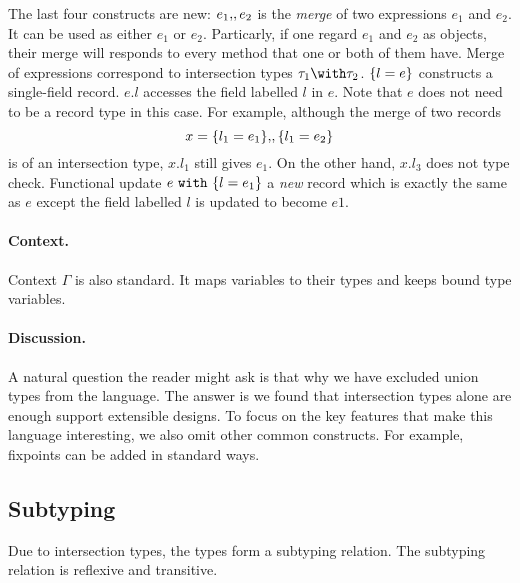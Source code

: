 The last four constructs are new: $ e_1 ,\!, e_2 $ is the \emph{merge} of two
expressions $ e_1 $ and $ e_2 $.
It can be used as either $ e_1 $ or $ e_2 $. Particarly, if one regard $ e_1 $
and $ e_2 $ as objects, their merge will responds to every method that one or
both of them have. Merge of expressions correspond to intersection types
$ \ty_1 \intersects \ty_2 $. $ \{ l = e \} $ constructs a single-field record.
$ e.l $ accesses the field labelled $ l $ in $ e $. Note that $ e $ does not
need to be a record type in this case. For example, although the merge of two
records
\[
x = \{ l_1 = e_1 \} ,\!, \{ l_1 = e_2 \} 
\]
is of an intersection type, $ x.{l_1} $ still gives $ e_1 $. On the other hand,
$ x.{l_3} $ does not type check. Functional update $ e ~ \texttt{with} ~ \{ l = e_1 \} $ a
\emph{new} record which is exactly the same as $ e $ except the field labelled
$ l $ is updated to become $ e1 $.

\paragraph{Context.} Context $ \Gamma $ is also standard. It maps variables to
their types and keeps bound type variables.

\paragraph{Discussion.} A natural question the reader might ask is that why we
have excluded union types from the language. The answer is we found that
intersection types alone are enough support extensible designs. To focus on the
key features that make this language interesting, we also omit other common
constructs. For example, fixpoints can be added in standard ways.

\subsection{Subtyping}


Due to intersection types, the types form a subtyping relation. The subtyping
relation is reflexive and transitive.



